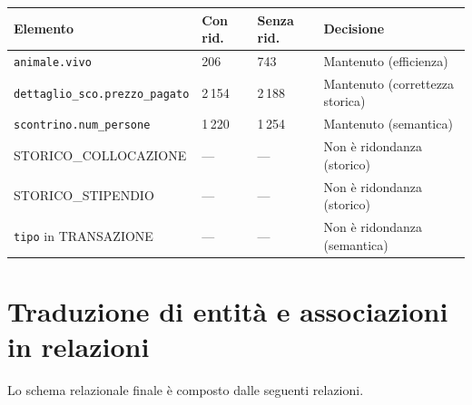 \documentclass[12pt,a4paper]{report}
\begin{document}
\begin{longtable}{L{5cm} C{2.2cm} C{2.2cm} C{3.2cm}}
\toprule
\textbf{Elemento} & \textbf{Con rid.} & \textbf{Senza rid.} & \textbf{Decisione} \\
\midrule
\endhead
\texttt{animale.vivo} & 206 & 743 & Mantenuto (efficienza) \\
\texttt{dettaglio\_sco.prezzo\_pagato} & 2\,154 & 2\,188 & Mantenuto (correttezza storica) \\
\texttt{scontrino.num\_persone} & 1\,220 & 1\,254 & Mantenuto (semantica) \\
STORICO\_COLLOCAZIONE & --- & --- & Non è ridondanza (storico) \\
STORICO\_STIPENDIO & --- & --- & Non è ridondanza (storico) \\
\texttt{tipo} in TRANSAZIONE & --- & --- & Non è ridondanza (semantica) \\
\bottomrule
\end{longtable}

\section{Traduzione di entità e associazioni in relazioni}

Lo schema relazionale finale è composto dalle seguenti relazioni.
\end{document}
